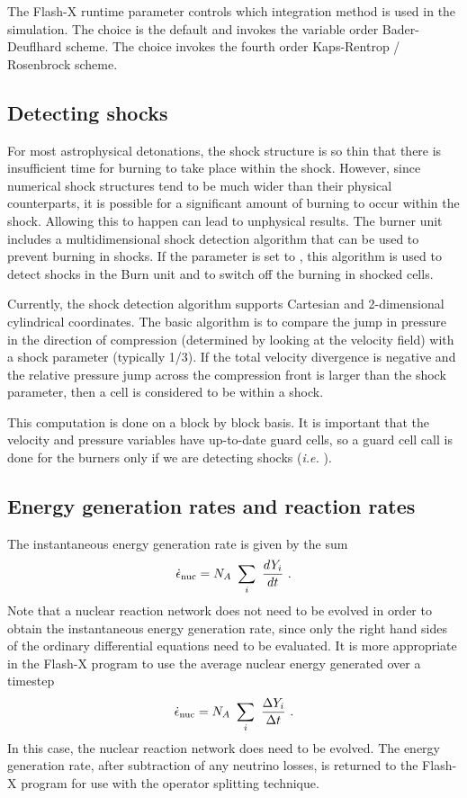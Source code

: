 The Flash-X runtime parameter 
controls which integration method is used in the simulation. The choice
 is the default and invokes the variable order
Bader-Deuflhard scheme.  The choice  invokes the
fourth order Kaps-Rentrop / Rosenbrock scheme.

\subsection{Detecting shocks}

For most astrophysical detonations, the shock structure is so thin
that there is insufficient time for burning to take place within the
shock.  However, since numerical shock structures tend to be much
wider than their physical counterparts, it is possible for a significant
amount of burning to occur within the shock.  Allowing this to happen
can lead to unphysical results.  The burner unit includes a
multidimensional shock detection algorithm that can be used to prevent
burning in shocks.  If the  parameter is set to
, this algorithm is used to detect shocks in the
Burn unit and to switch off the burning in shocked
cells.

Currently, the shock detection algorithm supports Cartesian and 2-dimensional
cylindrical coordinates.  The basic algorithm is to compare the jump
in pressure in the direction of compression (determined by looking at
the velocity field) with a shock parameter (typically 1/3).  If the
total velocity divergence is negative and the relative pressure jump
across the compression front is larger than the shock parameter, then
a cell is considered to be within a shock.

This computation is done on a block by block basis.  It is important
that the velocity and pressure variables have up-to-date guard cells,
so a guard cell call is done for the burners only if we are detecting
shocks ({\it i.e.} ).


\subsection{Energy generation rates and reaction rates}

The instantaneous energy generation rate is given by the sum
\begin{equation}
\dot {\epsilon}_{\rm nuc} = N_A \ \sum_i \ {dY_{i}\over dt} \ .
\end{equation}
Note that a nuclear reaction network does not need to be evolved in
order to obtain the instantaneous energy generation rate, since only
the right hand sides of the ordinary differential equations need to be
evaluated. It is more appropriate in the Flash-X program to use the
average nuclear energy generated over a timestep
\begin{equation}
\dot {\epsilon}_{\rm nuc} = N_A \ \sum_i \ {\Delta Y_i \over \Delta t}\ .
\end{equation}
In this case, the nuclear reaction network does need to be evolved.
The energy generation rate, after subtraction of any neutrino losses,
is returned to the Flash-X program for use with the operator splitting
technique.

